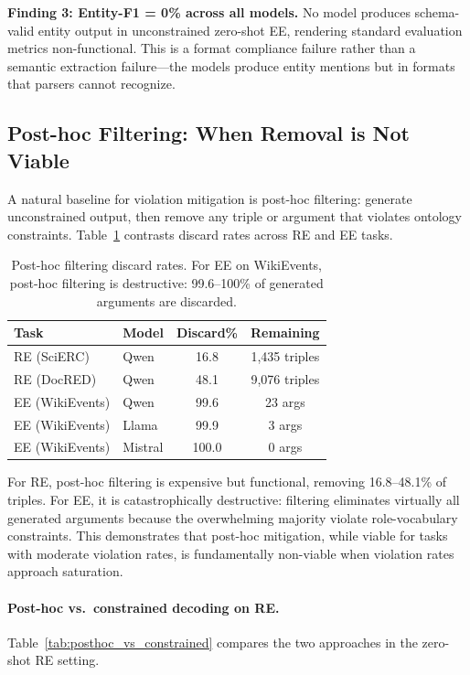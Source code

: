 \documentclass[11pt]{article}
\begin{document}
\textbf{Finding 3: Entity-F1 = 0\% across all models.}
No model produces schema-valid entity output in unconstrained zero-shot EE, rendering standard evaluation metrics non-functional.
This is a format compliance failure rather than a semantic extraction failure---the models produce entity mentions but in formats that parsers cannot recognize.


\subsection{Post-hoc Filtering: When Removal is Not Viable}
\label{sec:posthoc}

A natural baseline for violation mitigation is post-hoc filtering: generate unconstrained output, then remove any triple or argument that violates ontology constraints.
Table~\ref{tab:posthoc} contrasts discard rates across RE and EE tasks.

\begin{table}[t]
\centering
\small
\caption{Post-hoc filtering discard rates. For EE on WikiEvents, post-hoc filtering is destructive: 99.6--100\% of generated arguments are discarded.}
\label{tab:posthoc}
\begin{tabular}{llcc}
\toprule
\textbf{Task} & \textbf{Model} & \textbf{Discard\%} & \textbf{Remaining} \\
\midrule
RE (SciERC)     & Qwen    & 16.8  & 1,435 triples \\
RE (DocRED)     & Qwen    & 48.1  & 9,076 triples \\
\midrule
EE (WikiEvents) & Qwen    & 99.6  & 23 args \\
EE (WikiEvents) & Llama   & 99.9  & 3 args \\
EE (WikiEvents) & Mistral & 100.0 & 0 args \\
\bottomrule
\end{tabular}
\end{table}

For RE, post-hoc filtering is expensive but functional, removing 16.8--48.1\% of triples.
For EE, it is catastrophically destructive: filtering eliminates virtually all generated arguments because the overwhelming majority violate role-vocabulary constraints.
This demonstrates that post-hoc mitigation, while viable for tasks with moderate violation rates, is fundamentally non-viable when violation rates approach saturation.

\paragraph{Post-hoc vs.\ constrained decoding on RE.}
Table~\ref{tab:posthoc_vs_constrained} compares the two approaches in the zero-shot RE setting.
\end{document}
